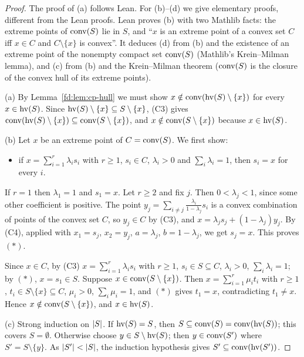 \begin{proof}
The proof of (a) follows Lean. For (b)--(d) we give elementary proofs, different from the Lean proofs. Lean proves (b)
with two Mathlib facts: the extreme points of $\operatorname{conv}(S)$ lie in $S$, and ``$x$ is an extreme point of a convex set $C$
iff $x\in C$ and $C\setminus\{x\}$ is convex''. It deduces (d) from (b) and the existence of an extreme point of the
nonempty compact set $\operatorname{conv}(S)$ (Mathlib's Krein--Milman lemma), and (c) from (b) and the Krein--Milman theorem
($\operatorname{conv}(S)$ is the closure of the convex hull of its extreme points).

(a) By Lemma~\ref{fd:lem:cp-hull} we must show $x\notin\operatorname{conv}(\operatorname{hv}(S)\setminus\{x\})$ for every $x\in\operatorname{hv}(S)$. Since
$\operatorname{hv}(S)\setminus\{x\}\subseteq S\setminus\{x\}$, (C3) gives $\operatorname{conv}(\operatorname{hv}(S)\setminus\{x\})\subseteq\operatorname{conv}(S\setminus\{x\})$,
and $x\notin\operatorname{conv}(S\setminus\{x\})$ because $x\in\operatorname{hv}(S)$.

(b) Let $x$ be an extreme point of $C=\operatorname{conv}(S)$. We first show:
\begin{itemize}
\item[$(*)$] if $x=\sum_{i=1}^r\lambda_is_i$ with $r\ge1$, $s_i\in C$, $\lambda_i>0$ and $\sum_i\lambda_i=1$, then
  $s_i=x$ for every $i$.
\end{itemize}
If $r=1$ then $\lambda_1=1$ and $s_1=x$. Let $r\ge2$ and fix $j$. Then $0<\lambda_j<1$, since some other coefficient is
positive. The point $y_j=\sum_{i\ne j}\frac{\lambda_i}{1-\lambda_j}s_i$ is a convex combination of points of the convex
set $C$, so $y_j\in C$ by (C3), and $x=\lambda_js_j+(1-\lambda_j)y_j$. By (C4), applied with $x_1=s_j$, $x_2=y_j$,
$a=\lambda_j$, $b=1-\lambda_j$, we get $s_j=x$. This proves $(*)$.

Since $x\in C$, by (C3) $x=\sum_{i=1}^r\lambda_is_i$ with $r\ge1$, $s_i\in S\subseteq C$, $\lambda_i>0$,
$\sum_i\lambda_i=1$; by $(*)$, $x=s_1\in S$. Suppose $x\in\operatorname{conv}(S\setminus\{x\})$. Then $x=\sum_{i=1}^r\mu_it_i$ with
$r\ge1$, $t_i\in S\setminus\{x\}\subseteq C$, $\mu_i>0$, $\sum_i\mu_i=1$, and $(*)$ gives $t_1=x$, contradicting
$t_1\ne x$. Hence $x\notin\operatorname{conv}(S\setminus\{x\})$, and $x\in\operatorname{hv}(S)$.

(c) Strong induction on $\lvert S\rvert$. If $\operatorname{hv}(S)=S$, then $S\subseteq\operatorname{conv}(S)=\operatorname{conv}(\operatorname{hv}(S))$; this covers $S=\emptyset$.
Otherwise choose $y\in S\setminus\operatorname{hv}(S)$; then $y\in\operatorname{conv}(S')$ where $S'=S\setminus\{y\}$. As $\lvert S'\rvert<\lvert S\rvert$, the
induction hypothesis gives $S'\subseteq\operatorname{conv}(\operatorname{hv}(S'))$.


\end{proof}
